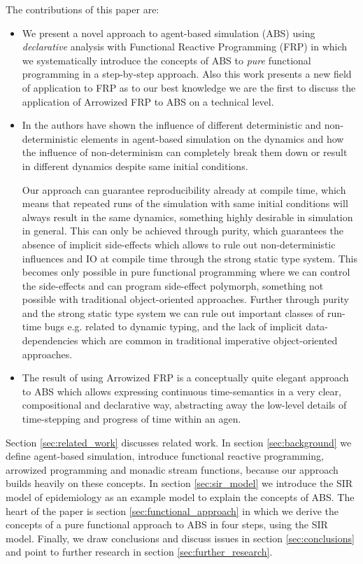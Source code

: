 The contributions of this paper are:
\begin{itemize}
	\item We present a novel approach to agent-based simulation (ABS) using \textit{declarative} analysis with Functional Reactive Programming (FRP) in which we systematically introduce the concepts of ABS to \textit{pure} functional programming in a step-by-step approach. Also this work presents a new field of application to FRP as to our best knowledge we are the first to discuss the application of Arrowized FRP to ABS on a technical level.
	
	\item In \cite{thaler_art_2017} the authors have shown the influence of different deterministic and non-deterministic elements in agent-based simulation on the dynamics and how the influence of non-determinism can completely break them down or result in different dynamics despite same initial conditions.
	
	Our approach can guarantee reproducibility already at compile time, which means that repeated runs of the simulation with same initial conditions will always result in the same dynamics, something highly desirable in simulation in general. This can only be achieved through purity, which guarantees the absence of implicit side-effects which allows to rule out non-deterministic influences and IO at compile time through the strong static type system. This becomes only possible in pure functional programming where we can control the side-effects and can program side-effect polymorph, something not possible with traditional object-oriented approaches. Further through purity and the strong static type system we can rule out important classes of run-time bugs e.g. related to dynamic typing, and the lack of implicit data-dependencies which are common in traditional imperative object-oriented approaches.
	
	\item The result of using Arrowized FRP is a conceptually quite elegant approach to ABS which allows expressing continuous time-semantics in a very clear, compositional and declarative way, abstracting away the low-level details of time-stepping and progress of time within an agen.
\end{itemize}

Section \ref{sec:related_work} discusses related work. In section \ref{sec:background} we define agent-based simulation, introduce functional reactive programming, arrowized programming and monadic stream functions, because our approach builds heavily on these concepts. In section \ref{sec:sir_model} we introduce the SIR model of epidemiology as an example model to explain the concepts of ABS. The heart of the paper is section \ref{sec:functional_approach} in which we derive the concepts of a pure functional approach to ABS in four steps, using the SIR model. Finally, we draw conclusions and discuss issues in section \ref{sec:conclusions} and point to further research in section \ref{sec:further_research}.

